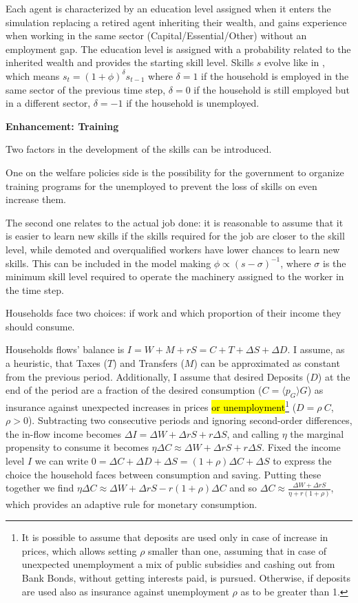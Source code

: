 \documentclass[a4paper, headings=standardclasses]{scrartcl}
\newenvironment{enh}[1][]{\begin{framed}\noindent\textbf{Enhancement: #1}\par}{\end{framed}}
\begin{document}
Each agent is characterized by an education level assigned when it enters the simulation replacing a retired agent inheriting their wealth, and gains experience when working in the same sector (Capital/Essential/Other) without an employment gap.
The education level is assigned with a probability related to the inherited wealth and provides the starting skill level.
Skills $s$ evolve like in \textcite{dosi2018}, which means $s_t = (1+\phi)^\delta s_{t-1}$ where $\delta=1$ if the household is employed in the same sector of the previous time step, $\delta=0$ if the household is still employed but in a different sector, $\delta=-1$ if the household is unemployed.

\begin{enh}[Training]
	Two factors in the development of the skills can be introduced.

	One on the welfare policies side is the possibility for the government to organize training programs for the unemployed to prevent the loss of skills on even increase them.

	The second one relates to the actual job done: it is reasonable to assume that it is easier to learn new skills if the skills required for the job are closer to the skill level, while demoted and overqualified workers have lower chances to learn new skills. This can be included in the model making $\phi \propto (s-\sigma)^{-1}$, where $\sigma$ is the minimum skill level required to operate the machinery assigned to the worker in the time step.
\end{enh}

Households face two choices: if work and which proportion of their income they should consume.

Households flows' balance is $I = W + M + rS = C + T + \Delta S + \Delta D$.
I assume, as a heuristic, that Taxes ($T$) and Transfers ($M$) can be approximated as constant from the previous period.
Additionally, I assume that desired Deposits ($D$) at the end of the period are a fraction of the desired consumption ($C = \langle p_G \rangle G$) as insurance against unexpected increases in prices \hl{or unemployment}\footnote{It is possible to assume that deposits are used only in case of increase in prices, which allows setting $\rho$ smaller than one, assuming that in case of unexpected unemployment a mix of public subsidies and cashing out from Bank Bonds, without getting interests paid, is pursued. Otherwise, if deposits are used also as insurance against unemployment $\rho$ as to be greater than 1.} ($D = \rho~C$, $\rho > 0$).
Subtracting two consecutive periods and ignoring second-order differences, the in-flow income becomes $\Delta I = \Delta W + \Delta r S + r \Delta S$, and calling $\eta$ the marginal propensity to consume it becomes $\eta \Delta C \approx \Delta W + \Delta r S + r \Delta S$.
Fixed the income level $I$ we can write $0 = \Delta C + \Delta D + \Delta S = (1+\rho) \Delta C + \Delta S$ to express the choice the household faces between consumption and saving.
Putting these together we find $\eta \Delta C \approx \Delta W + \Delta r S - r (1+\rho) \Delta C$ and so $\Delta C \approx \frac{\Delta W + \Delta r S}{\eta + r (1+\rho)}$, which provides an adaptive rule for monetary consumption.
\end{document}
